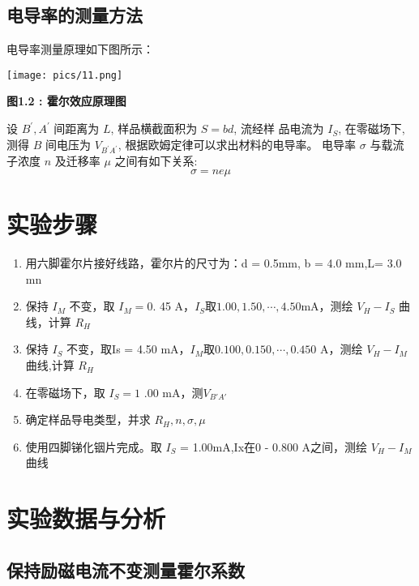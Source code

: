 \documentclass[10pt,a4paper]{article}
\makeatletter
\newenvironment{figurehere}
{\def\@captype{figure}}
{}
\makeatother
\begin{document}
	\subsection{电导率的测量方法}

	电导率测量原理如下图所示：
	
	\begin{figurehere}
		\centering
		\texttt{[image: pics/11.png]}
		\caption*{\bf 图1.2 : 霍尔效应原理图}
	\end{figurehere}

	设 $B^{\prime}, A^{\prime}$ 间距离为 $L$, 样品横截面积为 $S=b d$, 流经样 品电流为 $I_S$, 在零磁场下, 测得 $B$ 间电压为 $V_{B^{\prime} A^{\prime}}$, 根据欧姆定律可以求出材料的电导率。 电导率 $\sigma$ 与载流子浓度 $n$ 及迁移率 $\mu$ 之间有如下关系:
	$$
	\sigma=n e \mu
	$$

	\section{实验步骤}
	
	\begin{enumerate}
		\item 用六脚霍尔片接好线路，霍尔片的尺寸为：d = 0.5mm, b = 4.0 mm,L= 3.0 mn

		\item 保持 $I_{M}$ 不变，取 $I_{M}=0.$ 45 A，$I_{S}$取$1.00, 1.50,\cdots,4.50$mA，测绘 $V_{H}-I_{S}$ 曲线，计算 $R_H$

		\item 保持 $I_{S}$ 不变，取Is = 4.50 mA，$I_{M}$取$0.100,0.150,\cdots,0.450$ A，测绘 $V_{H}-I_{M}$ 曲线,计算 $R_H$

		\item 在零磁场下，取 $I_{S}=1$ .00 mA，测$V_{B'A'}$

		\item 确定样品导电类型，并求 $R_H, n, \sigma, \mu$

		\item 使用四脚锑化铟片完成。取 $I_{S}$ = 1.00mA,Ix在0 - 0.800 A之间，测绘 $V_{H}-I_{M}$ 曲线
	\end{enumerate}
	
	\newpage
	\section{实验数据与分析}

	\subsection{保持励磁电流不变测量霍尔系数}
\end{document}
